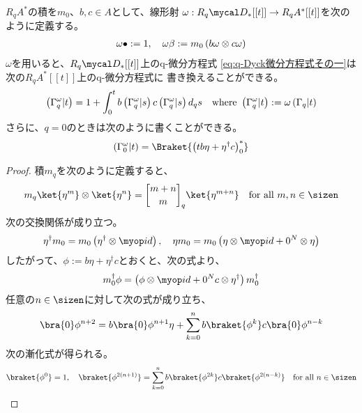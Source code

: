 {	$R_qA^*$の積を$m_0$、$b,c\in A$として、線形射
	$\omega:R_q\D_*[[t]]\to R_qA^*[[t]]$を次のように定義する。
	\begin{equation*}\begin{split}
		\omega\bullet := 1,\quad
		\omega\beta := m_0\left({b\omega\otimes c\omega}\right)
	\end{split}\end{equation*}
	$\omega$を用いると、$R_q\D_*[[t]]$上のq-微分方程式
	\eqref{eq:q-Dyck微分方程式その一}は次の$R_qA^*[[t]]$上のq-微分方程式に
	書き換えることができる。
	\begin{equation}\label{eq:q-Dyck微分方程式その二}\begin{split}
		\left({\Gamma_q^\omega|t}\right) = 1 + \int_0^t b\left({\Gamma_q^\omega|s}\right)c
			\left({\Gamma_q^\omega|s}\right) d_qs
			\quad\text{where } \left({\Gamma_q^\omega|t}\right) := \omega\left({\Gamma_q|t}\right)
	\end{split}\end{equation}
	さらに、$q=0$のときは次のように書くことができる。
	\begin{equation*}\begin{split}
		\lr{\Gamma_0^\omega|t} = \Braket{\lr{tb\eta + \eta^\dag c}_0^*}
	\end{split}\end{equation*}
	\begin{proof} %
		積$m_q$を次のように定義すると、
		\begin{equation*}\begin{split}
			m_q\ket{\eta^m}\otimes\ket{\eta^n} 
			= \qbinom{m+n}{m}_q\ket{\eta^{m+n}} \quad\text{for all } m,n\in\sizen
		\end{split}\end{equation*}
		次の交換関係が成り立つ。
		\begin{equation*}\begin{split}
			\eta^\dag m_0 = m_0\lr{\eta^\dag\otimes\id},\quad 
			\eta m_0 = m_0\lr{\eta\otimes\id + 0^N\otimes\eta}
		\end{split}\end{equation*}
		したがって、$\phi:=b\eta + \eta^\dag c$とおくと、次の式より、
		\begin{equation*}\begin{split}
			m_0^\dag\phi = \lr{\phi\otimes\id + 0^Nc\otimes\eta^\dag}m_0^\dag
		\end{split}\end{equation*}
		任意の$n\in\sizen$に対して次の式が成り立ち、
		\begin{equation}\label{eq:Dyck言語の因子化その一}\begin{split}
			\bra{0}\phi^{n+2} = b\bra{0}\phi^{n+1}\eta
				+ \sum_{k=0}^{n} b\braket{\phi^{k}}c\bra{0}\phi^{n-k}
		\end{split}\end{equation}
		次の漸化式が得られる。
		\begin{equation*}\begin{split}
			\braket{\phi^0} = 1,\quad
			\braket{\phi^{2\lr{n+1}}} = \sum_{k=0}^n b
				\braket{\phi^{2k}}c\braket{\phi^{2\lr{n-k}}}
			\quad\text{for all } n\in\sizen
		\end{split}\end{equation*}
	\end{proof} %

}
